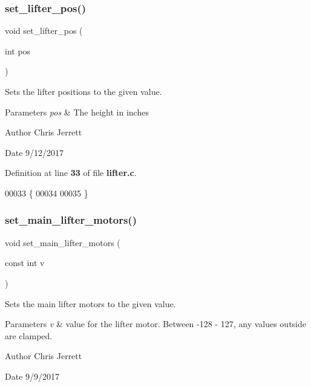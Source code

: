 \subsubsection{set\+\_\+lifter\+\_\+pos()}
{\footnotesize\ttfamily void set\+\_\+lifter\+\_\+pos (\begin{DoxyParamCaption}\item[{int}]{pos }\end{DoxyParamCaption})}



Sets the lifter positions to the given value. 


\begin{DoxyParams}{Parameters}
{\em pos} & The height in inches \\
\hline
\end{DoxyParams}
\begin{DoxyAuthor}{Author}
Chris Jerrett 
\end{DoxyAuthor}
\begin{DoxyDate}{Date}
9/12/2017 
\end{DoxyDate}


Definition at line \textbf{ 33} of file \textbf{ lifter.\+c}.


\begin{DoxyCode}
00033                              \{
00034 
00035 \}
\end{DoxyCode}
\mbox{\label{lifter_8c_ad00a195af30f246924d6e1a30095b882}} 
\subsubsection{set\+\_\+main\+\_\+lifter\+\_\+motors()}
{\footnotesize\ttfamily void set\+\_\+main\+\_\+lifter\+\_\+motors (\begin{DoxyParamCaption}\item[{const int}]{v }\end{DoxyParamCaption})}



Sets the main lifter motors to the given value. 


\begin{DoxyParams}{Parameters}
{\em v} & value for the lifter motor. Between -\/128 -\/ 127, any values outside are clamped. \\
\hline
\end{DoxyParams}
\begin{DoxyAuthor}{Author}
Chris Jerrett 
\end{DoxyAuthor}
\begin{DoxyDate}{Date}
9/9/2017 
\end{DoxyDate}



